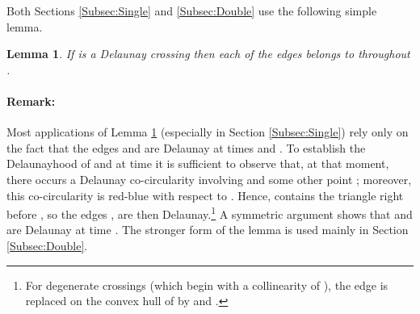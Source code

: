 \documentclass[letter,11pt]{article}
\newtheorem{lemma}[theorem]{Lemma}
\begin{document}
\smallskip
Both Sections \ref{Subsec:Single} and \ref{Subsec:Double} use the following simple lemma.


\begin{lemma}\label{Lemma:Crossing}
If  is a Delaunay crossing then each of the edges  belongs to  throughout .
\end{lemma}
\paragraph{Remark:}
Most applications of Lemma \ref{Lemma:Crossing} (especially in Section \ref{Subsec:Single}) 
rely only on the fact that the edges  and 
are Delaunay at times  and .
To establish the Delaunayhood of  and  at time  it is sufficient to observe that, at that moment, there occurs a Delaunay co-circularity involving  and some other point ; moreover, this co-circularity is red-blue with respect to . Hence,  contains the triangle  right before , so the edges ,  are then Delaunay.\footnote{For degenerate crossings (which begin with a collinearity of ), the edge  is replaced on the convex hull of  by  and .}
A symmetric argument shows that  and  are Delaunay at time . 
The stronger form of the lemma is used mainly in Section \ref{Subsec:Double}.
\end{document}
